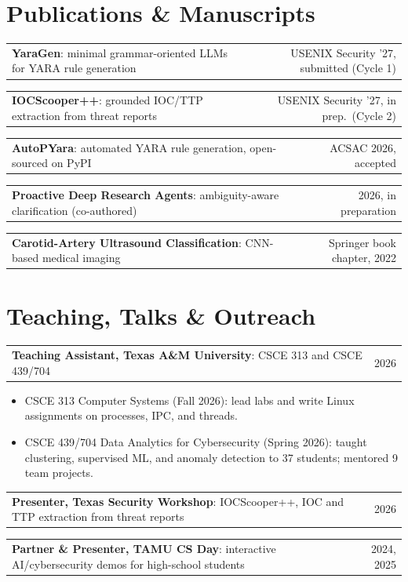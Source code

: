 \documentclass[letterpaper,11pt]{article}
\makeatletter
\newcommand{\heading}[2]{%
  \vspace{2pt}%
  \begin{tabularx}{\textwidth}{@{}>{\raggedright\arraybackslash\small}X@{\hspace{1em}}>{\small}r@{}}
    #1 & #2 \\
  \end{tabularx}\par\vspace{-1pt}%
}
\makeatother
\begin{document}
\section{Publications \& Manuscripts}

\heading{\textbf{YaraGen}: minimal grammar-oriented LLMs for YARA rule generation}{USENIX Security '27, submitted (Cycle 1)}
\heading{\textbf{IOCScooper++}: grounded IOC/TTP extraction from threat reports}{USENIX Security '27, in prep.\ (Cycle 2)}
\heading{\textbf{AutoPYara}: automated YARA rule generation, open-sourced on PyPI}{ACSAC 2026, accepted}
\heading{\textbf{Proactive Deep Research Agents}: ambiguity-aware clarification (co-authored)}{2026, in preparation}
\heading{\textbf{Carotid-Artery Ultrasound Classification}: CNN-based medical imaging}{Springer book chapter, 2022}

\section{Teaching, Talks \& Outreach}

\heading{\textbf{Teaching Assistant, Texas A\&M University}: CSCE 313 and CSCE 439/704}{2026}
\begin{itemize}\small
  \item CSCE 313 Computer Systems (Fall 2026): lead labs and write Linux assignments on processes, IPC, and threads.
  \item CSCE 439/704 Data Analytics for Cybersecurity (Spring 2026): taught clustering, supervised ML, and anomaly detection to 37 students; mentored 9 team projects.
\end{itemize}
\heading{\textbf{Presenter, Texas Security Workshop}: IOCScooper++, IOC and TTP extraction from threat reports}{2026}
\heading{\textbf{Partner \& Presenter, TAMU CS Day}: interactive AI/cybersecurity demos for high-school students}{2024, 2025}

\end{document}
